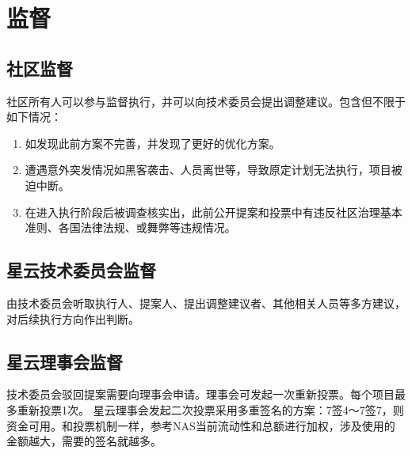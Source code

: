 \section{监督}
\subsection{社区监督}
社区所有人可以参与监督执行，并可以向技术委员会提出调整建议。包含但不限于如下情况：
\begin{enumerate}
\item 如发现此前方案不完善，并发现了更好的优化方案。
\item 遭遇意外突发情况如黑客袭击、人员离世等，导致原定计划无法执行，项目被迫中断。
\item 在进入执行阶段后被调查核实出，此前公开提案和投票中有违反社区治理基本准则、各国法律法规、或舞弊等违规情况。
\end{enumerate}

\subsection{星云技术委员会监督}
由技术委员会听取执行人、提案人、提出调整建议者、其他相关人员等多方建议，对后续执行方向作出判断。
\subsection{星云理事会监督}
技术委员会驳回提案需要向理事会申请。理事会可发起一次重新投票。每个项目最多重新投票1次。
星云理事会发起二次投票采用多重签名的方案：7签4～7签7，则资金可用。和投票机制一样，参考NAS当前流动性和总额进行加权，涉及使用的金额越大，需要的签名就越多。
